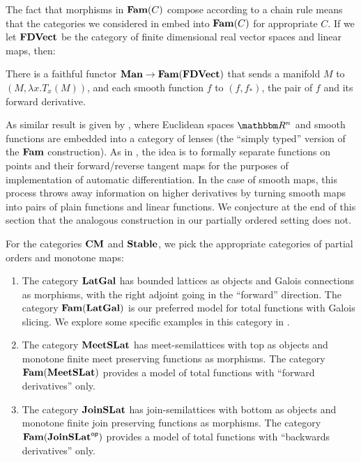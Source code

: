 The fact that morphisms in $\mathbf{Fam}(C)$ compose according to a chain rule
means that the categories we considered in 
embed into $\mathbf{Fam}(C)$ for appropriate $C$. If we let $\mathbf{FDVect}$ be the
category of finite dimensional real vector spaces and linear maps,
then:

\begin{proposition}
  \label{prop:embed-manifolds}
  There is a faithful functor $\mathbf{Man} \to \mathbf{Fam}(\mathbf{FDVect})$ that sends a
  manifold $M$ to $(M, \lambda x. T_x(M))$, and each smooth function
  $f$ to $(f, f_*)$, the pair of $f$ and its forward derivative.
\end{proposition}

As similar result is given by \citet{cruttwell2022}, where Euclidean
spaces $\RR^n$ and smooth functions are embedded into a category of
lenses (the ``simply typed'' version of the $\mathbf{Fam}$ construction). As
in \citet{vakar22}, the idea is to formally separate functions on
points and their forward/reverse tangent maps for the purposes of
implementation of automatic differentiation. In the case of smooth
maps, this process throws away information on higher derivatives by
turning smooth maps into pairs of plain functions and linear
functions. We conjecture at the end of this section that the analogous
construction in our partially ordered setting does not.

For the categories $\mathbf{CM}$ and $\mathbf{Stable}$, we pick the appropriate
categories of partial orders and monotone maps:

\begin{enumerate}[leftmargin=\enummargin]
\item The category $\mathbf{LatGal}$ has bounded lattices as objects and
  Galois connections as morphisms, with the right adjoint going in the
  ``forward'' direction. The category $\mathbf{Fam}(\mathbf{LatGal})$ is our preferred
  model for total functions with Galois slicing. We explore some
  specific examples in this category in .
\item The category $\mathbf{MeetSLat}$ has meet-semilattices with top as
  objects and monotone finite meet preserving functions as
  morphisms. The category $\mathbf{Fam}(\mathbf{MeetSLat})$ provides a model of
  total functions with ``forward derivatives'' only.
\item The category $\mathbf{JoinSLat}$ has join-semilattices with bottom as
  objects and monotone finite join preserving functions as
  morphisms. The category $\mathbf{Fam}(\mathbf{JoinSLat}^{\mathsf{op}})$ provides a model of
  total functions with ``backwards derivatives'' only.
\end{enumerate}

